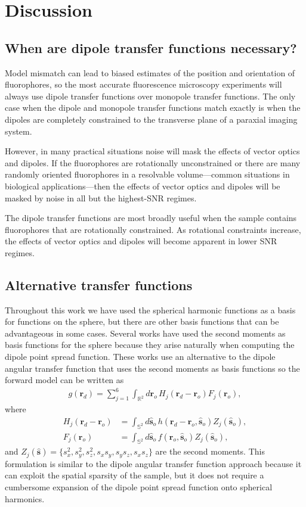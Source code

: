 \documentclass[]{osa-article}
\providecommand{\ro}{\mathbf{\mathbf{r}}_o}
\providecommand{\so}{\mathbf{\hat{s}}_o}
\providecommand{\rd}{\mathbf{r}_d}
\providecommand{\mh}[1]{\mathbf{\hat{#1}}}
\providecommand{\mbb}[1]{\mathbb{#1}}
\begin{document}
\section{Discussion}\label{sec:discussion}
\subsection{When are dipole transfer functions necessary?}
Model mismatch can lead to biased estimates of the position and orientation of
fluorophores, so the most accurate fluorescence microscopy experiments will
always use dipole transfer functions over monopole transfer functions. The only
case when the dipole and monopole transfer functions match exactly is when the
dipoles are completely constrained to the transverse plane of a paraxial imaging
system.

However, in many practical situations noise will mask the effects of vector
optics and dipoles. If the fluorophores are rotationally unconstrained or there
are many randomly oriented fluorophores in a resolvable volume---common
situations in biological applications---then the effects of vector optics and
dipoles will be masked by noise in all but the highest-SNR regimes.

The dipole transfer functions are most broadly useful when the sample contains
fluorophores that are rotationally constrained. As rotational constraints
increase, the effects of vector optics and dipoles will become apparent in lower
SNR regimes.
 
\subsection{Alternative transfer functions}
Throughout this work we have used the spherical harmonic functions as a basis
for functions on the sphere, but there are other basis functions that can be
advantageous in some cases. Several works \cite{aguet2009, backer2014,
  brasselet2011, zhang2018, zhang2018-2} have used the second moments as basis
functions for the sphere because they arise naturally when computing the dipole
point spread function. These works use an alternative to the dipole angular
transfer function that uses the second moments as basis functions so the forward
model can be written as
\begin{align}
  g(\rd) = \sum_{j=1}^6 \int_{\mbb{R}^2}d\ro\, H_j(\rd - \ro)F_j(\ro),
\end{align}
where
\begin{align}
  H_j(\rd - \ro) &= \int_{\mbb{S}^2}d\so\, h(\rd - \ro, \so)Z_j(\so),\\
  F_j(\ro) &= \int_{\mbb{S}^2}d\so\, f(\ro, \so)Z_j(\so),
\end{align}
and $Z_j(\mh{s}) = \{s_x^2, s_y^2, s_z^2, s_xs_y, s_ys_z, s_xs_z\}$ are the
second moments. This formulation is similar to the dipole angular transfer
function approach because it can exploit the spatial sparsity of the sample, but
it does not require a cumbersome expansion of the dipole point spread function
onto spherical harmonics.
\end{document}
